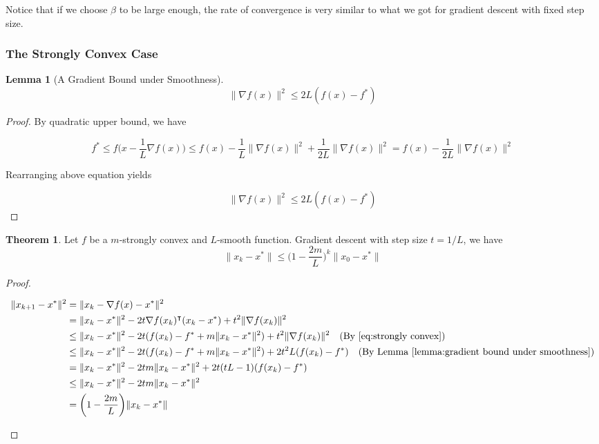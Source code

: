 \documentclass[12pt]{article} %
\theoremstyle{definition}
\newtheorem{lemma}{Lemma}
\newtheorem{theorem}{Theorem}
\begin{document}
 Notice that if we choose $\beta$ to be large enough, the rate of convergence is very similar to what we got for gradient descent with fixed step size.

\subsubsection*{The Strongly Convex Case}

\begin{lemma}[A Gradient Bound under Smoothness]
	\label{lemma:gradient bound under smoothness}
	$$
		\| \nabla f(x) \|^2 \le 2L (f(x) - f^*)
	$$
\end{lemma}

\begin{proof}
	By quadratic upper bound, we have

	$$
		f^* \le f \bigg(x - \frac{1}{L} \nabla f(x) \bigg) \le f(x) - \frac{1}{L} \| \nabla f(x) \|^2 + \frac{1}{2L} \| \nabla f(x) \|^2 =  f(x) -  \frac{1}{2L} \| \nabla f(x) \|^2
	$$

	Rearranging above equation yields

	$$
		\| \nabla f(x) \|^2 \le 2L (f(x) - f^*)
	$$
\end{proof}

\begin{theorem}
	Let $f$ be a $m$-strongly convex and $L$-smooth function. Gradient descent with step size $t = 1 / L$, we have
	$$
		\| x_k - x^* \| \le \bigg(1 - \frac{2m}{L} \bigg)^k \| x_0 - x^* \|
	$$
\end{theorem}

\begin{proof}
	\begin{ceqn}
		\begin{align*}
			\| x_{k +1} - x^* \|^2 
			&= \| x_k - \nabla f(x) - x^* \|^2 \\
			&= \|x_k - x^*\|^2 - 2t \nabla f(x_k)^\intercal (x_k - x^*) + t^2 \| \nabla f(x_k) \|^2 \\
			&\le  \|x_k - x^*\|^2 - 2t (f(x_k) - f^* + m \| x_k - x^* \|^2) + t^2 \| \nabla f(x_k) \|^2 \quad \text{(By \eqref{eq:strongly convex})} \\
			&\le  \|x_k - x^*\|^2 - 2t (f(x_k) - f^* + m \| x_k - x^* \|^2) + 2 t^2 L (f(x_k) - f^*) \quad \text{(By Lemma \ref{lemma:gradient bound under smoothness})} \\
			&= \|x_k - x^*\|^2 - 2t m \| x_k - x^* \|^2 + 2t (tL - 1) (f(x_k) - f^*) \\
			&\le \|x_k - x^*\|^2 - 2t m \| x_k - x^* \|^2 \\
			&= \bigg(1 - \frac{2m}{L} \bigg) \| x_k - x^* \|
		\end{align*}
	\end{ceqn}
\end{proof}




\end{document}
